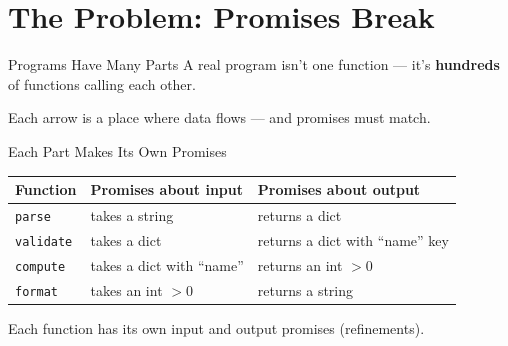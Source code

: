 \documentclass[aspectratio=169,10pt]{beamer}
\begin{document}
\section{The Problem: Promises Break}

\begin{frame}{Programs Have Many Parts}
A real program isn't one function --- it's \textbf{hundreds} of functions calling each other.
\vspace{0.3em}
\begin{center}
\end{center}
Each arrow is a place where data flows --- and promises must match.
\end{frame}

\begin{frame}{Each Part Makes Its Own Promises}
\begin{center}
\begin{tabular}{@{}lll@{}}
\textbf{Function} & \textbf{Promises about input} & \textbf{Promises about output} \\
\hline
\texttt{parse}    & takes a string & returns a dict \\
\texttt{validate} & takes a dict   & returns a dict with ``name'' key \\
\texttt{compute}  & takes a dict with ``name'' & returns an int $> 0$ \\
\texttt{format}   & takes an int $> 0$ & returns a string \\
\end{tabular}
\end{center}
\vspace{0.3em}
Each function has its own input and output promises (refinements).
\end{frame}
\end{document}
